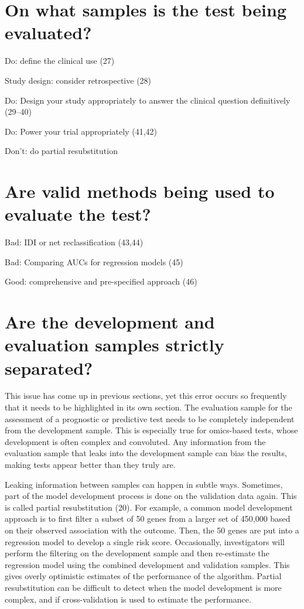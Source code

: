 \documentclass[11pt]{article}
\begin{document}
\section{On what samples is the test being
evaluated?}\label{on-what-samples-is-the-test-being-evaluated}

Do: define the clinical use (27)

Study design: consider retrospective (28)

Do: Design your study appropriately to answer the clinical question
definitively (29--40)

Do: Power your trial appropriately (41,42)

Don't: do partial resubstitution

\section{Are valid methods being used to evaluate the
test?}\label{are-valid-methods-being-used-to-evaluate-the-test}

Bad: IDI or net reclassification (43,44)

Bad: Comparing AUCs for regression models (45)

Good: comprehensive and pre-specified approach (46)

\section{Are the development and evaluation samples strictly
separated?}\label{are-the-development-and-evaluation-samples-strictly-separated}

This issue has come up in previous sections, yet this error occurs so
frequently that it needs to be highlighted in its own section. The
evaluation sample for the assessment of a prognostic or predictive test
needs to be completely independent from the development sample. This is
especially true for omics-based tests, whose development is often
complex and convoluted. Any information from the evaluation sample that
leaks into the development sample can bias the results, making tests
appear better than they truly are.

Leaking information between samples can happen in subtle ways.
Sometimes, part of the model development process is done on the
validation data again. This is called partial resubstitution (20). For
example, a common model development approach is to first filter a subset
of 50 genes from a larger set of 450,000 based on their observed
association with the outcome. Then, the 50 genes are put into a
regression model to develop a single risk score. Occasionally,
investigators will perform the filtering on the development sample and
then re-estimate the regression model using the combined development and
validation samples. This gives overly optimistic estimates of the
performance of the algorithm. Partial resubstitution can be difficult to
detect when the model development is more complex, and if
cross-validation is used to estimate the performance.
\end{document}
